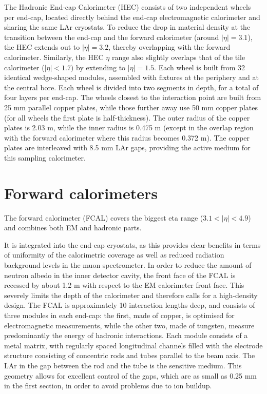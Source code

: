 The Hadronic End-cap Calorimeter (HEC) consists of two
independent wheels per end-cap, located directly behind the end-cap electromagnetic calorimeter
and sharing the same LAr cryostats. To reduce the drop in material density at the transition between
the end-cap and the forward calorimeter (around $|\eta| = 3.1$), the HEC extends out to $|\eta| = 3.2$,
thereby overlapping with the forward calorimeter. Similarly, the HEC $\eta$ range also slightly overlaps
that of the tile calorimeter ($|\eta| < 1.7)$ by extending to $|\eta| = 1.5$. Each wheel is built from 32
identical wedge-shaped modules, assembled with fixtures at the periphery and at the central bore.
Each wheel is divided into two segments in depth, for a total of four layers per end-cap. The wheels
closest to the interaction point are built from 25 mm parallel copper plates, while those further away
use 50 mm copper plates (for all wheels the first plate is half-thickness). The outer radius of the
copper plates is 2.03 m, while the inner radius is 0.475 m (except in the overlap region with the
forward calorimeter where this radius becomes 0.372 m). The copper plates are interleaved with
8.5 mm LAr gaps, providing the active medium for this sampling calorimeter.

\section{Forward calorimeters}
\label{sec:ATLAS_FCAL}

The forward calorimeter (FCAL) covers the biggest eta range ($3.1 < |\eta| < 4.9$) and combines both EM and hadronic parts.

It is integrated into the end-cap cryostats, as this provides
clear benefits in terms of uniformity of the calorimetric coverage as well as
reduced radiation background levels in the muon spectrometer. In order to reduce the amount of
neutron albedo in the inner detector cavity, the front face of the FCAL is recessed by about 1.2 m
with respect to the EM calorimeter front face. This severely limits the depth of the calorimeter
and therefore calls for a high-density design. The FCAL is approximately 10 interaction lengths
deep, and consists of three modules in each end-cap: the first, made of copper, is optimised for
electromagnetic measurements, while the other two, made of tungsten, measure predominantly the
energy of hadronic interactions. Each module consists of a metal matrix, with regularly spaced
longitudinal channels filled with the electrode structure consisting of concentric rods and tubes
parallel to the beam axis. The LAr in the gap between the rod and the tube is the sensitive medium.
This geometry allows for excellent control of the gaps, which are as small as 0.25 mm in the first
section, in order to avoid problems due to ion buildup.

